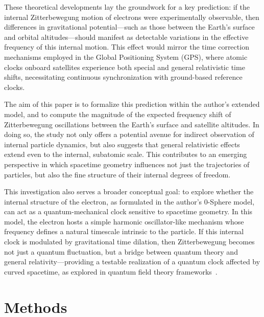 \documentclass[%
 reprint,
 amsmath,amssymb,
 aps,
]{revtex4-1}
\numberwithin{equation}{section}%
\begin{document}
These theoretical developments lay the groundwork for a key prediction: if the internal Zitterbewegung motion of electrons were experimentally observable, then differences in gravitational potential—such as those between the Earth's surface and orbital altitudes—should manifest as detectable variations in the effective frequency of this internal motion. This effect would mirror the time correction mechanisms employed in the Global Positioning System (GPS), where atomic clocks onboard satellites experience both special and general relativistic time shifts, necessitating continuous synchronization with ground-based reference clocks.

The aim of this paper is to formalize this prediction within the author's extended model, and to compute the magnitude of the expected frequency shift of Zitterbewegung oscillations between the Earth's surface and satellite altitudes. In doing so, the study not only offers a potential avenue for indirect observation of internal particle dynamics, but also suggests that general relativistic effects extend even to the internal, subatomic scale. This contributes to an emerging perspective in which spacetime geometry influences not just the trajectories of particles, but also the fine structure of their internal degrees of freedom.

This investigation also serves a broader conceptual goal: to explore whether the internal structure of the electron, as formulated in the author's 0-Sphere model, can act as a quantum-mechanical clock sensitive to spacetime geometry. In this model, the electron hosts a simple harmonic oscillator-like mechanism whose frequency defines a natural timescale intrinsic to the particle. If this internal clock is modulated by gravitational time dilation, then Zitterbewegung becomes not just a quantum fluctuation, but a bridge between quantum theory and general relativity—providing a testable realization of a quantum clock affected by curved spacetime, as explored in quantum field theory frameworks~\cite{birrell1982}.


\section{Methods}
\end{document}
